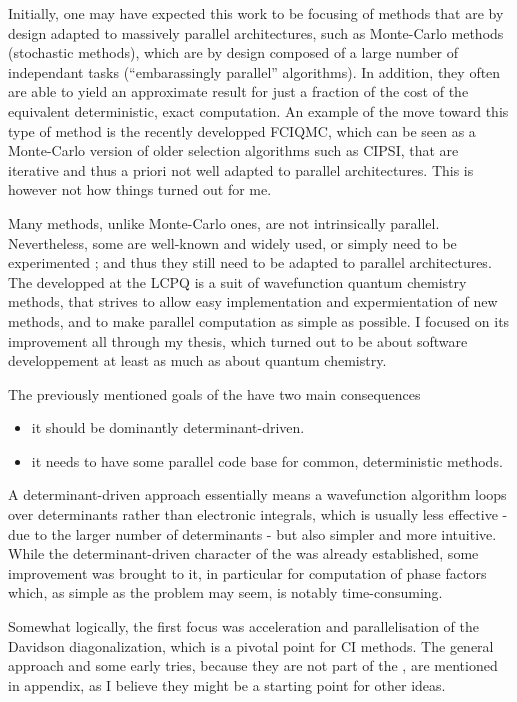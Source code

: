 \documentclass[12pt,a4paper]{report}
\begin{document}
Initially, one may have expected this work to be focusing of methods that are by design adapted to massively parallel architectures, such as Monte-Carlo methods (stochastic methods), which are by design composed of a large number of independant tasks (``embarassingly parallel'' algorithms). In addition, they often are able to yield an approximate result for just a fraction of the cost of the equivalent deterministic, exact computation. An example of the move toward this type of method is the recently developped FCIQMC, which can be seen as a Monte-Carlo version of older selection algorithms such as CIPSI, that are iterative and thus a priori not well adapted to parallel architectures. This is however not how things turned out for me.

Many methods, unlike Monte-Carlo ones, are not intrinsically parallel. Nevertheless, some are well-known and widely used, or simply need to be experimented ; and thus they still need to be adapted to parallel architectures. The \QP developped at the LCPQ is a suit of wavefunction quantum chemistry methods, that strives to allow easy implementation and expermientation of new methods, and to make parallel computation as simple as possible. I focused on its improvement all through my thesis, which turned out to be about software developpement at least as much as about quantum chemistry.

The previously mentioned goals of the \QP have two main consequences
\begin{itemize}
\item
it should be dominantly determinant-driven.
\item
it needs to have some parallel code base for common, deterministic methods.
\end{itemize}


A determinant-driven approach essentially means a wavefunction algorithm loops over determinants rather than electronic integrals, which is usually less effective - due to the larger number of determinants - but also simpler and more intuitive. While the determinant-driven character of the \QP was already established, some improvement was brought to it, in particular for computation of phase factors which, as simple as the problem may seem, is notably time-consuming.

Somewhat logically, the first focus was acceleration and parallelisation of the Davidson diagonalization, which is a pivotal point for CI methods. The general approach and some early tries, because they are not part of the \QP, are mentioned in appendix, as I believe they might be a starting point for other ideas.
\end{document}
